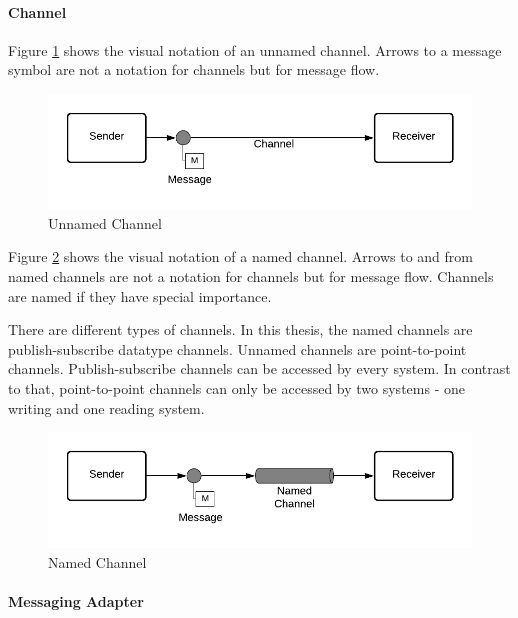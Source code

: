 \paragraph{Channel}

Figure \ref{messaging:channel1} shows the visual notation of an unnamed channel. Arrows to a message symbol are not a notation for channels but for message flow.

\begin{figure}[H]
    \centering
    \includegraphics[scale=0.6]{Diagrams/Messaging/3. Channel.pdf}
    \caption{Unnamed Channel}
    \label{messaging:channel1}
\end{figure}

Figure \ref{messaging:channel2} shows the visual notation of a named channel. Arrows to and from named channels are not a notation for channels but for message flow. Channels are named if they have special importance.

There are different types of channels. In this thesis, the named channels are publish-subscribe datatype channels. Unnamed channels are point-to-point channels. Publish-subscribe channels can be accessed by every system. In contrast to that, point-to-point channels can only be accessed by two systems - one writing and one reading system.

\begin{figure}[H]
    \centering
    \includegraphics[scale=0.6]{Diagrams/Messaging/2. Channel.pdf}
    \caption{Named Channel}
    \label{messaging:channel2}
\end{figure}

\paragraph{Messaging Adapter}

